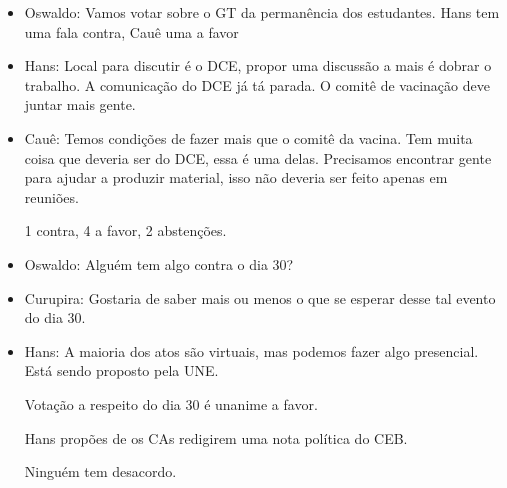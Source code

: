 \documentclass{ata-calico}
\begin{document}
\begin{itemize}
    \item Oswaldo: Vamos votar sobre o GT da permanência dos estudantes. Hans tem uma fala contra, Cauê uma a favor
    
    \item Hans: Local para discutir é o DCE, propor uma discussão a mais é dobrar o  trabalho. A comunicação do DCE já tá parada. O comitê de vacinação deve juntar mais gente.
    
    \item Cauê: Temos condições de fazer mais que o comitê da vacina. Tem muita coisa que deveria ser do DCE, essa é uma delas. Precisamos encontrar gente para ajudar a produzir material, isso não deveria ser feito apenas em reuniões.
    
    1 contra,
    4 a favor,
    2 abstenções.
    
    \item Oswaldo: Alguém tem algo contra o dia 30?
    
    \item Curupira: Gostaria de saber mais ou menos o que se esperar desse tal evento do dia 30.
    
    \item Hans: A maioria dos atos são virtuais, mas podemos fazer algo presencial. Está sendo proposto pela UNE.
    
    Votação a respeito do dia 30 é unanime a favor.
    
    Hans propões de os CAs redigirem uma nota política do CEB.
    
    Ninguém tem desacordo.

\end{itemize}

\end{document}
